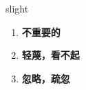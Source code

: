 
\begin{frame}
{\huge slight}
\begin{center}
\begin{enumerate}\Large
  \item \textbf{不重要的}
  \item \textbf{轻蔑，看不起}
  \item \textbf{忽略，疏忽}
\end{enumerate}
\end{center}
\end{frame}

